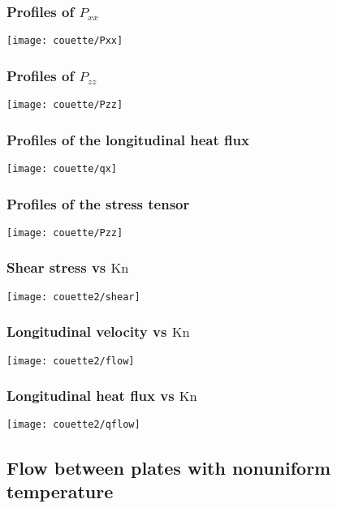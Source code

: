 \documentclass[mathserif]{beamer} %
\newcommand{\Kn}{\mathrm{Kn}}
\begin{document}
\begin{frame}
    \frametitle{Profiles of \(P_{xx}\)}
    \centering
    \texttt{[image: couette/Pxx]}
\end{frame}

\begin{frame}
    \frametitle{Profiles of \(P_{zz}\)}
    \centering
    \texttt{[image: couette/Pzz]}
\end{frame}

\begin{frame}
    \frametitle{Profiles of the longitudinal heat flux}
    \centering
    \texttt{[image: couette/qx]}
\end{frame}

\begin{frame}
    \frametitle{Profiles of the stress tensor}
    \centering
    \texttt{[image: couette/Pzz]}
\end{frame}

\begin{frame}
    \frametitle{Shear stress vs \(\Kn\)}
    \vspace{-2pt}
    \centering\hspace{-1.5cm}
    \texttt{[image: couette2/shear]}
    \hspace{-1.5cm}
\end{frame}

\begin{frame}
    \frametitle{Longitudinal velocity vs \(\Kn\)}
    \vspace{-2pt}
    \centering\hspace{-1.5cm}
    \texttt{[image: couette2/flow]}
    \hspace{-1.5cm}
\end{frame}

\begin{frame}
    \frametitle{Longitudinal heat flux vs \(\Kn\)}
    \vspace{-2pt}
    \centering\hspace{-1.5cm}
    \texttt{[image: couette2/qflow]}
    \hspace{-1.5cm}
\end{frame}

\subsection{Flow between plates with nonuniform temperature}
\end{document}
